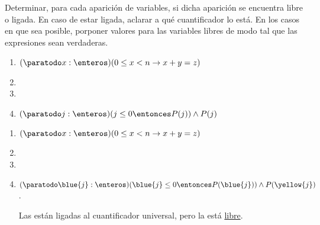 \begin{enunciado}{\ejercicio}
  Determinar, para cada aparición de variables, si dicha aparición se encuentra libre o ligada. En caso de estar ligada,
  aclarar a qué cuantificador lo está. En los casos en que sea posible, porponer valores para las variables libres de modo
  tal que las expresiones sean verdaderas.

  \begin{enumerate}[label=\alph*)]
    \item $(\paratodo x: \enteros)(0 \leq x < n \to x+y =z)$
    \item \hacer
    \item \hacer
    \item $(\paratodo j: \enteros)(j \leq 0 \entonces P(j) ) \land P(j)$
  \end{enumerate}
\end{enunciado}

\begin{enumerate}[label=\alph*)]
  \item $(\paratodo x: \enteros)(0 \leq x < n \to x+y =z)$
  \item \hacer
  \item \hacer
  \item $(\paratodo \blue{j}: \enteros)(\blue{j} \leq 0 \entonces P(\blue{j}) )
          \land P(\yellow{j})$.\par
        Las  están ligadas al cuantificador universal, pero la  está \href{\libre}{libre}.
\end{enumerate}

